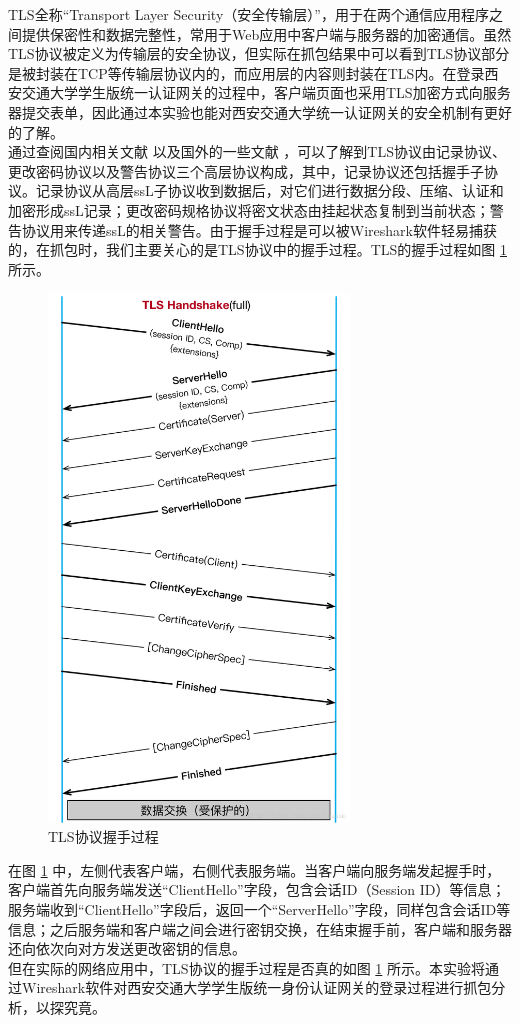 \qquad 
TLS全称“Transport Layer Security（安全传输层）”，用于在两个通信应用程序之间提供保密性和数据完整性，常用于Web应用中客户端与服务器的加密通信。虽然TLS协议被定义为传输层的安全协议，但实际在抓包结果中可以看到TLS协议部分是被封装在TCP等传输层协议内的，而应用层的内容则封装在TLS内。在登录西安交通大学学生版统一认证网关的过程中，客户端页面也采用TLS加密方式向服务器提交表单，因此通过本实验也能对西安交通大学统一认证网关的安全机制有更好的了解。\\
\qquad
通过查阅国内相关文献 \cite{TLS-1} 以及国外的一些文献 \cite{TLS-2} ，可以了解到TLS协议由记录协议、更改密码协议以及警告协议三个高层协议构成，其中，记录协议还包括握手子协议。记录协议从高层ssL子协议收到数据后，对它们进行数据分段、压缩、认证和加密形成ssL记录；更改密码规格协议将密文状态由挂起状态复制到当前状态；警告协议用来传递ssL的相关警告。由于握手过程是可以被Wireshark软件轻易捕获的，在抓包时，我们主要关心的是TLS协议中的握手过程。TLS的握手过程如图 \ref{fig1} 所示。\\
\begin{figure}
	\centering
	\includegraphics[width=8cm]{image/TLS-Handshake}
	\caption{TLS协议握手过程 \cite{TLS-3}}
	\label{fig1}
\end{figure}
\qquad
在图 \ref{fig1} 中，左侧代表客户端，右侧代表服务端。当客户端向服务端发起握手时，客户端首先向服务端发送“ClientHello”字段，包含会话ID（Session ID）等信息；服务端收到“ClientHello”字段后，返回一个“ServerHello”字段，同样包含会话ID等信息；之后服务端和客户端之间会进行密钥交换，在结束握手前，客户端和服务器还向依次向对方发送更改密钥的信息。\\
\qquad
但在实际的网络应用中，TLS协议的握手过程是否真的如图 \ref{fig1} 所示。本实验将通过Wireshark软件对西安交通大学学生版统一身份认证网关的登录过程进行抓包分析，以探究竟。\\